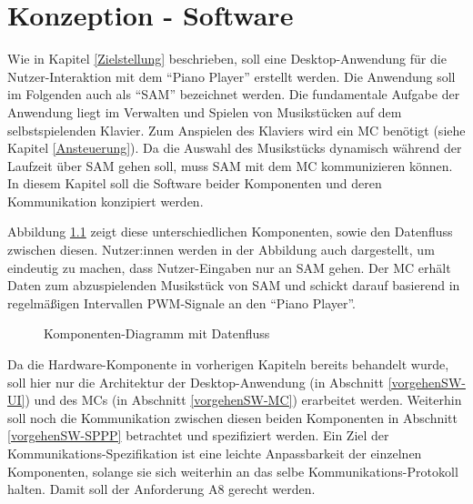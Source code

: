 
\chapter{Konzeption - Software} \label{vorgehenSW}

Wie in Kapitel \ref{Zielstellung} beschrieben, soll eine Desktop-Anwendung für die Nutzer-Interaktion mit dem \enquote{Piano Player} erstellt werden.
Die Anwendung soll im Folgenden auch als \enquote{\acf{SAM}} bezeichnet werden.
Die fundamentale Aufgabe der Anwendung liegt im Verwalten und Spielen von Musikstücken auf dem selbstspielenden Klavier.
Zum Anspielen des Klaviers wird ein \acf{MC} benötigt (siehe Kapitel \ref{Ansteuerung}).
Da die Auswahl des Musikstücks dynamisch während der Laufzeit über \acf{SAM} gehen soll, muss \ac{SAM} mit dem \ac{MC} kommunizieren können.
In diesem Kapitel soll die Software beider Komponenten und deren Kommunikation konzipiert werden.

Abbildung \ref*{fig:high-level-komponenten} zeigt diese unterschiedlichen Komponenten, sowie den Datenfluss zwischen diesen.
Nutzer:innen werden in der Abbildung auch dargestellt, um eindeutig zu machen, dass Nutzer-Eingaben nur an \ac{SAM} gehen.
Der \ac{MC} erhält Daten zum abzuspielenden Musikstück von \ac{SAM} und schickt darauf basierend in regelmäßigen Intervallen \ac{PWM}-Signale an den \enquote{Piano Player}.

\begin{figure}[htbp]
    \centering
    \caption{Komponenten-Diagramm mit Datenfluss}
    \label{fig:high-level-komponenten}
\end{figure}

Da die Hardware-Komponente in vorherigen Kapiteln bereits behandelt wurde, soll hier nur die Architektur der Desktop-Anwendung (in Abschnitt \ref{vorgehenSW-UI}) und des \ac{MC}s (in Abschnitt \ref{vorgehenSW-MC}) erarbeitet werden.
Weiterhin soll noch die Kommunikation zwischen diesen beiden Komponenten in Abschnitt \ref{vorgehenSW-SPPP} betrachtet und spezifiziert werden.
Ein Ziel der Kommunikations-Spezifikation ist eine leichte Anpassbarkeit der einzelnen Komponenten, solange sie sich weiterhin an das selbe Kommunikations-Protokoll halten.
Damit soll der Anforderung A8 gerecht werden.

